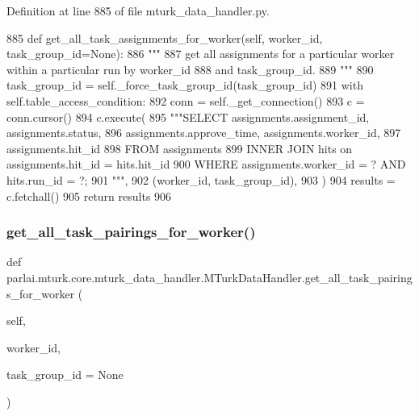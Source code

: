 Definition at line 885 of file mturk\+\_\+data\+\_\+handler.\+py.


\begin{DoxyCode}
885     \textcolor{keyword}{def }get\_all\_task\_assignments\_for\_worker(self, worker\_id, task\_group\_id=None):
886         \textcolor{stringliteral}{"""}
887 \textcolor{stringliteral}{        get all assignments for a particular worker within a particular run by worker\_id}
888 \textcolor{stringliteral}{        and task\_group\_id.}
889 \textcolor{stringliteral}{        """}
890         task\_group\_id = self.\_force\_task\_group\_id(task\_group\_id)
891         with self.table\_access\_condition:
892             conn = self.\_get\_connection()
893             c = conn.cursor()
894             c.execute(
895                 \textcolor{stringliteral}{"""SELECT assignments.assignment\_id, assignments.status,}
896 \textcolor{stringliteral}{                         assignments.approve\_time, assignments.worker\_id,}
897 \textcolor{stringliteral}{                         assignments.hit\_id}
898 \textcolor{stringliteral}{                         FROM assignments}
899 \textcolor{stringliteral}{                         INNER JOIN hits on assignments.hit\_id = hits.hit\_id}
900 \textcolor{stringliteral}{                         WHERE assignments.worker\_id = ? AND hits.run\_id = ?;}
901 \textcolor{stringliteral}{                         """},
902                 (worker\_id, task\_group\_id),
903             )
904             results = c.fetchall()
905             \textcolor{keywordflow}{return} results
906 
\end{DoxyCode}
\mbox{\label{classparlai_1_1mturk_1_1core_1_1mturk__data__handler_1_1MTurkDataHandler_a6077d39b847f52f65dc7cedc709ea25c}} 
\subsubsection{\texorpdfstring{get\+\_\+all\+\_\+task\+\_\+pairings\+\_\+for\+\_\+worker()}{get\_all\_task\_pairings\_for\_worker()}}
{\footnotesize\ttfamily def parlai.\+mturk.\+core.\+mturk\+\_\+data\+\_\+handler.\+M\+Turk\+Data\+Handler.\+get\+\_\+all\+\_\+task\+\_\+pairings\+\_\+for\+\_\+worker (\begin{DoxyParamCaption}\item[{}]{self,  }\item[{}]{worker\+\_\+id,  }\item[{}]{task\+\_\+group\+\_\+id = {\ttfamily None} }\end{DoxyParamCaption})}

